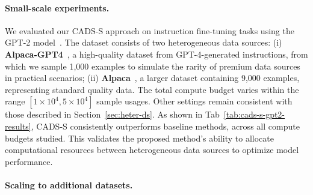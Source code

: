 \paragraph{Small-scale experiments.}
We evaluated our CADS-S approach on instruction fine-tuning tasks using the GPT-2 model~\cite{Radford2019LanguageMA}. The dataset consists of two heterogeneous data sources: (i) \textbf{Alpaca-GPT4}~\cite{alpaca-gpt4}, a high-quality dataset from GPT-4-generated instructions, from which we sample 1,000 examples to simulate the rarity of premium data sources in practical scenarios; (ii) \textbf{Alpaca}~\cite{alpaca}, a larger dataset containing 9,000 examples, representing standard quality data. The total compute budget varies within the range \([1 \times 10^{4}, 5 \times 10^{4}]\) sample usages. Other settings remain consistent with those described in Section~\ref{sec:heter-ds}. As shown in Tab~\ref{tab:cads-s-gpt2-results}, CADS-S consistently outperforms baseline methods, across all compute budgets studied. This validates the proposed method’s ability to allocate computational resources between heterogeneous data sources to optimize model performance. 

\paragraph{Scaling to additional datasets.}

